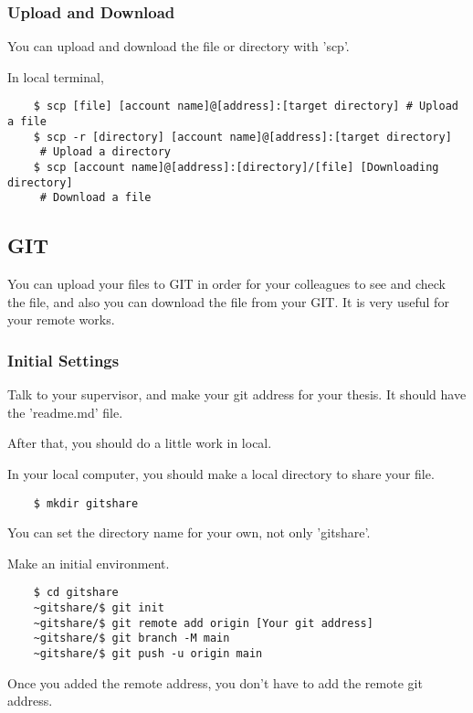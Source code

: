 \subsubsection{Upload and Download}

You can upload and download the file or directory with 'scp'.

In local terminal,

\begin{verbatim}
    $ scp [file] [account name]@[address]:[target directory] # Upload a file
    $ scp -r [directory] [account name]@[address]:[target directory]
     # Upload a directory
    $ scp [account name]@[address]:[directory]/[file] [Downloading directory]
     # Download a file
\end{verbatim}

\subsection{GIT}

You can upload your files to GIT in order for your colleagues to see and check the file, and also you can download the file from your GIT. It is very useful for your remote works.

\subsubsection{Initial Settings}

Talk to your supervisor, and make your git address for your thesis. It should have the 'readme.md' file.

After that, you should do a little work in local.

In your local computer, you should make a local directory to share your file.

\begin{verbatim}
    $ mkdir gitshare
\end{verbatim}

You can set the directory name for your own, not only 'gitshare'.

Make an initial environment.

\begin{verbatim}
    $ cd gitshare
    ~gitshare/$ git init
    ~gitshare/$ git remote add origin [Your git address]
    ~gitshare/$ git branch -M main
    ~gitshare/$ git push -u origin main
\end{verbatim}

Once you added the remote address, you don't have to add the remote git address.

